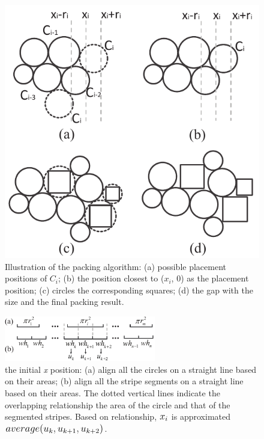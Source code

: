 \begin{figure}[t ]
  \centering
  \vspace{-3mm}
 \includegraphics[width=0.7\linewidth]{fig/packing}
 \vspace{-1mm}
  \caption{
  Illustration of the packing algorithm:
  (a)  possible placement positions of $C_i$;
  (b)  the position closest to ($x_i$, 0) as the placement position;
  (c)  circles  the corresponding squares;
  (d)  the gap with the size  and  the final packing result.
  }
  \label{fig:packing}
  \vspace{-3mm}
\end{figure}

\begin{figure}[b]
  \centering
  \vspace{-3mm}
 \includegraphics[width=2.6in]{fig/packposition3}
  \caption{
   the initial \emph{x} position:
  (a) align all the circles on a straight line based on their areas;
  (b) align all the stripe segments on a straight line based on their areas.
  The dotted vertical lines indicate the overlapping relationship  the area of the circle and that of the segmented stripes.
  Based on  relationship, $\normalsize x_i$ is approximated  $\normalsize average(u_k, u_{k+1}, u_{k+2})$.
  }
  \label{fig:xvalue}
\end{figure}

